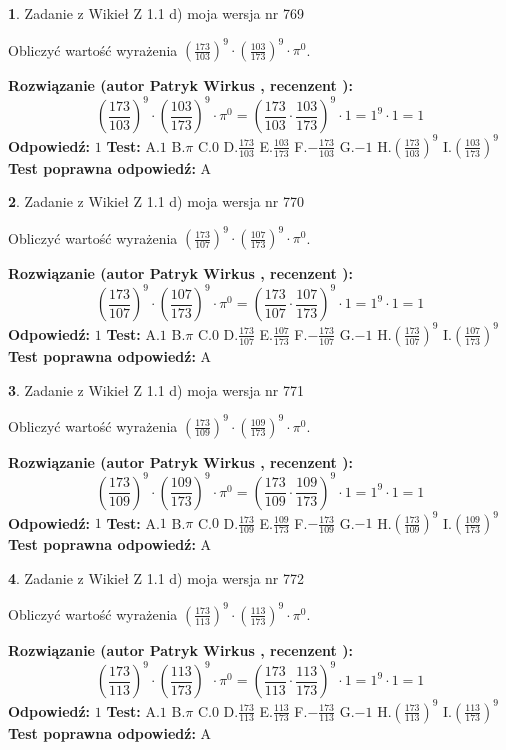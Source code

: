 \documentclass[12pt, a4paper]{article}
\theoremstyle{definition} %
\newtheorem{zad}{}
\newcommand{\zadStart}[1]{\begin{zad}#1\newline}
\newcommand{\zadStop}{\end{zad}}
\newcommand{\rozwStart}[2]{\noindent \textbf{Rozwiązanie (autor #1 , recenzent #2): }\newline}
\newcommand{\rozwStop}{\newline}
\newcommand{\odpStart}{\noindent \textbf{Odpowiedź:}\newline}
\newcommand{\odpStop}{\newline}
\newcommand{\testStart}{\noindent \textbf{Test:}\newline}
\newcommand{\testStop}{\newline}
\newcommand{\kluczStart}{\noindent \textbf{Test poprawna odpowiedź:}\newline}
\newcommand{\kluczStop}{\newline}
\begin{document}
\zadStart{Zadanie z Wikieł Z 1.1 d) moja wersja nr 769}

Obliczyć wartość wyrażenia $(\frac{173}{103})^{9} \cdot (\frac{103}{173})^{9} \cdot \pi^{0}$.
\zadStop
\rozwStart{Patryk Wirkus}{}
$$(\frac{173}{103})^{9} \cdot (\frac{103}{173})^{9} \cdot \pi^{0} = (\frac{173}{103} \cdot \frac{103}{173})^{9} \cdot 1 = 1^{9} \cdot 1 = 1$$
\rozwStop
\odpStart
$1$
\odpStop
\testStart
A.$1$ B.$\pi$ C.$0$ D.$\frac{173}{103}$ E.$\frac{103}{173}$
F.$-\frac{173}{103}$ G.$-1$
H.$(\frac{173}{103})^{9}$
I.$(\frac{103}{173})^{9}$
\testStop
\kluczStart
A
\kluczStop



\zadStart{Zadanie z Wikieł Z 1.1 d) moja wersja nr 770}

Obliczyć wartość wyrażenia $(\frac{173}{107})^{9} \cdot (\frac{107}{173})^{9} \cdot \pi^{0}$.
\zadStop
\rozwStart{Patryk Wirkus}{}
$$(\frac{173}{107})^{9} \cdot (\frac{107}{173})^{9} \cdot \pi^{0} = (\frac{173}{107} \cdot \frac{107}{173})^{9} \cdot 1 = 1^{9} \cdot 1 = 1$$
\rozwStop
\odpStart
$1$
\odpStop
\testStart
A.$1$ B.$\pi$ C.$0$ D.$\frac{173}{107}$ E.$\frac{107}{173}$
F.$-\frac{173}{107}$ G.$-1$
H.$(\frac{173}{107})^{9}$
I.$(\frac{107}{173})^{9}$
\testStop
\kluczStart
A
\kluczStop



\zadStart{Zadanie z Wikieł Z 1.1 d) moja wersja nr 771}

Obliczyć wartość wyrażenia $(\frac{173}{109})^{9} \cdot (\frac{109}{173})^{9} \cdot \pi^{0}$.
\zadStop
\rozwStart{Patryk Wirkus}{}
$$(\frac{173}{109})^{9} \cdot (\frac{109}{173})^{9} \cdot \pi^{0} = (\frac{173}{109} \cdot \frac{109}{173})^{9} \cdot 1 = 1^{9} \cdot 1 = 1$$
\rozwStop
\odpStart
$1$
\odpStop
\testStart
A.$1$ B.$\pi$ C.$0$ D.$\frac{173}{109}$ E.$\frac{109}{173}$
F.$-\frac{173}{109}$ G.$-1$
H.$(\frac{173}{109})^{9}$
I.$(\frac{109}{173})^{9}$
\testStop
\kluczStart
A
\kluczStop



\zadStart{Zadanie z Wikieł Z 1.1 d) moja wersja nr 772}

Obliczyć wartość wyrażenia $(\frac{173}{113})^{9} \cdot (\frac{113}{173})^{9} \cdot \pi^{0}$.
\zadStop
\rozwStart{Patryk Wirkus}{}
$$(\frac{173}{113})^{9} \cdot (\frac{113}{173})^{9} \cdot \pi^{0} = (\frac{173}{113} \cdot \frac{113}{173})^{9} \cdot 1 = 1^{9} \cdot 1 = 1$$
\rozwStop
\odpStart
$1$
\odpStop
\testStart
A.$1$ B.$\pi$ C.$0$ D.$\frac{173}{113}$ E.$\frac{113}{173}$
F.$-\frac{173}{113}$ G.$-1$
H.$(\frac{173}{113})^{9}$
I.$(\frac{113}{173})^{9}$
\testStop
\kluczStart
A
\kluczStop
\end{document}

